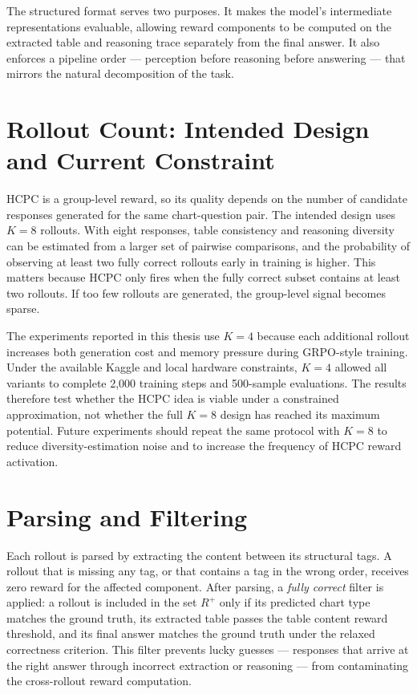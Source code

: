 \documentclass{iutbscthesis}
\begin{document}
The structured format serves two purposes. It makes the model's intermediate representations evaluable, allowing reward components to be computed on the extracted table and reasoning trace separately from the final answer. It also enforces a pipeline order --- perception before reasoning before answering --- that mirrors the natural decomposition of the task.

\section{Rollout Count: Intended Design and Current Constraint}

HCPC is a group-level reward, so its quality depends on the number of candidate responses generated for the same chart-question pair. The intended design uses $K=8$ rollouts. With eight responses, table consistency and reasoning diversity can be estimated from a larger set of pairwise comparisons, and the probability of observing at least two fully correct rollouts early in training is higher. This matters because HCPC only fires when the fully correct subset contains at least two rollouts. If too few rollouts are generated, the group-level signal becomes sparse.

The experiments reported in this thesis use $K=4$ because each additional rollout increases both generation cost and memory pressure during GRPO-style training. Under the available Kaggle and local hardware constraints, $K=4$ allowed all variants to complete 2,000 training steps and 500-sample evaluations. The results therefore test whether the HCPC idea is viable under a constrained approximation, not whether the full $K=8$ design has reached its maximum potential. Future experiments should repeat the same protocol with $K=8$ to reduce diversity-estimation noise and to increase the frequency of HCPC reward activation.

\section{Parsing and Filtering}

Each rollout is parsed by extracting the content between its structural tags. A rollout that is missing any tag, or that contains a tag in the wrong order, receives zero reward for the affected component. After parsing, a \emph{fully correct} filter is applied: a rollout is included in the set $R^+$ only if its predicted chart type matches the ground truth, its extracted table passes the table content reward threshold, and its final answer matches the ground truth under the relaxed correctness criterion. This filter prevents lucky guesses --- responses that arrive at the right answer through incorrect extraction or reasoning --- from contaminating the cross-rollout reward computation.
\end{document}
